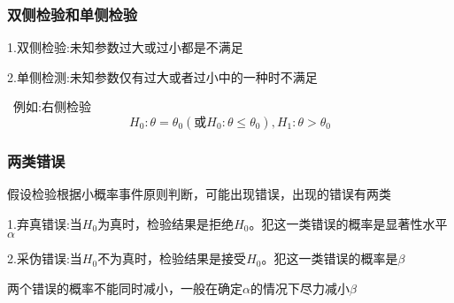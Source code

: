 \documentclass[11pt,twoside,a4paper]{ctexart}
\begin{document}
\subsubsection{双侧检验和单侧检验}
1.双侧检验:未知参数过大或过小都是不满足

2.单侧检测:未知参数仅有过大或者过小中的一种时不满足

\  例如:右侧检验
\[H_0 : \theta = \theta _0(\text{或}H_0 : \theta \leq  \theta _0), H_1 : \theta > \theta _0\]

\subsubsection{两类错误}
假设检验根据小概率事件原则判断，可能出现错误，出现的错误有两类

1.弃真错误:当$H_0$为真时，检验结果是拒绝$H_0$。犯这一类错误的概率是显著性水平$\alpha$

2.采伪错误:当$H_0$不为真时，检验结果是接受$H_0$。犯这一类错误的概率是$\beta $

两个错误的概率不能同时减小，一般在确定$\alpha$的情况下尽力减小$\beta $
\end{document}
